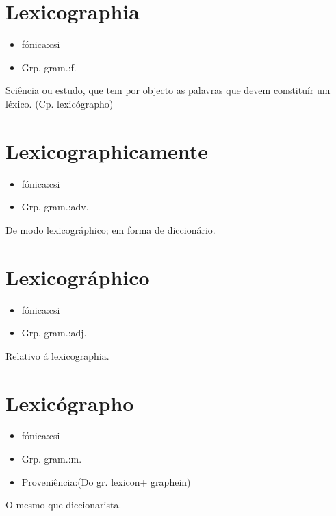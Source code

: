 \section{Lexicographia}
\begin{itemize}
\item {fónica:csi}
\end{itemize}
\begin{itemize}
\item {Grp. gram.:f.}
\end{itemize}
Sciência ou estudo, que tem por objecto as palavras que devem constituír um léxico.
(Cp. \textunderscore lexicógrapho\textunderscore )
\section{Lexicographicamente}
\begin{itemize}
\item {fónica:csi}
\end{itemize}
\begin{itemize}
\item {Grp. gram.:adv.}
\end{itemize}
De modo lexicográphico; em forma de diccionário.
\section{Lexicográphico}
\begin{itemize}
\item {fónica:csi}
\end{itemize}
\begin{itemize}
\item {Grp. gram.:adj.}
\end{itemize}
Relativo á lexicographia.
\section{Lexicógrapho}
\begin{itemize}
\item {fónica:csi}
\end{itemize}
\begin{itemize}
\item {Grp. gram.:m.}
\end{itemize}
\begin{itemize}
\item {Proveniência:(Do gr. \textunderscore lexicon\textunderscore  + \textunderscore graphein\textunderscore )}
\end{itemize}
O mesmo que \textunderscore diccionarista\textunderscore .
